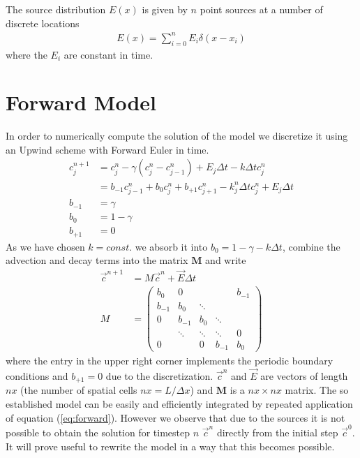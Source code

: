 \documentclass[]{article}
\begin{document}
The source distribution $E(x)$ is given by $n$ point sources at a number of discrete locations
\begin{align}
E(x) = \sum_{i=0}^{n} E_i \delta(x-x_i)
\end{align}
where the $E_i$ are constant in time.

\section{Forward Model}
In order to numerically compute the solution of the model we discretize it using an Upwind scheme with Forward Euler in time.
\begin{align}
c_j^{n+1} &= c_j^n - \gamma (c_j^n - c_{j-1}^n) + E_j \Delta t - k \Delta t c_j^n \\
&= b_{-1} c_{j-1}^n + b_0 c_j^n + b_{+1} c_{j+1}^n - k_j^n \Delta t c_j^n + E_j \Delta t\\
b_{-1} &= \gamma \\
b_0 &= 1 - \gamma \\
b_{+1} &= 0
\end{align}
As we have chosen $k = const.$ we absorb it into $b_0 = 1 - \gamma - k \Delta t$, combine the advection and decay terms into the matrix $\mathbf{M}$ and write
\begin{align}
\vec{c}^{n+1} &= M \vec{c}^n + \vec{E} \Delta t \label{eq:forward} \\
M &= 
\begin{pmatrix}
b_0 & 0 &   &  & b_{-1} \\
b_{-1} & b_0 & \ddots &  &  \\
0 & b_{-1} & b_0 & \ddots  \\
  & \ddots & \ddots & \ddots & 0 \\
0 &   & 0 & b_{-1} & b_0
\end{pmatrix}
\end{align}
where the entry in the upper right corner implements the periodic boundary conditions and $b_{+1} = 0$ due to the discretization. $\vec{c}^n$ and $\vec{E}$ are vectors of length $nx$ (the number of spatial cells $nx = L/\Delta x$) and $\mathbf{M}$ is a $nx \times nx$ matrix. The so established model can be easily and efficiently integrated by repeated application of equation (\ref{eq:forward}). However we observe that due to the sources it is not possible to obtain the solution for timestep $n$ $\vec{c}^n$ directly from the initial step $\vec{c}^0$. It will prove useful to rewrite the model in a way that this becomes possible.
\newline \newline
\end{document}

